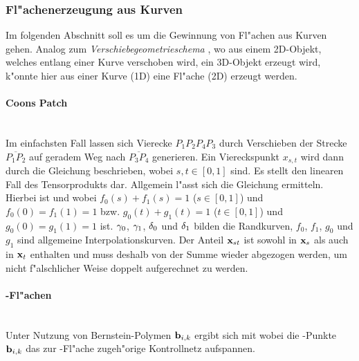 %
%

\subsubsection{Fl"achenerzeugung aus Kurven}
\label{freiform}
Im folgenden Abschnitt soll es um die Gewinnung von Fl"achen aus Kurven gehen. 
Analog zum \emph{Verschiebegeometrieschema} , wo aus 
einem 2D-Objekt, welches entlang einer Kurve verschoben wird, ein 3D-Objekt 
erzeugt wird, k"onnte hier aus einer Kurve (1D) eine Fl"ache (2D) erzeugt 
werden. 

\paragraph{Coons Patch}~\\
Im einfachsten Fall lassen sich 
Vierecke $P_1P_2P_4P_3$ durch Verschieben 
der Strecke $\overline{P_1P_2}$ auf geradem Weg nach $\overline{P_3P_4}$ 
generieren. Ein Viereckspunkt $x_{s,t}$ wird dann durch die Gleichung
beschrieben, wobei $s, t \in [0, 1]$ sind. Es stellt den linearen Fall
des Tensorprodukts dar. Allgemein l"asst sich die Gleichung
ermitteln. Hierbei ist
und
wobei $f_0(s) + f_1(s) = 1$ ($s \in{} [0, 1]$) und 
$f_0(0) = f_1(1) = 1$ bzw. $g_0(t) + g_1(t) = 1$ ($t \in{} [0, 1]$) 
und $g_0(0) = g_1(1) = 1$ ist. ${\bf \gamma}_0$, ${\bf \gamma}_1$, 
${\bf \delta}_0$ und ${\bf \delta}_1$ bilden die Randkurven, 
$f_0$, $f_1$, $g_0$ und $g_1$ sind allgemeine Interpolationskurven.
Der Anteil ${\bf x}_{st}$ ist sowohl in ${\bf x}_s$ als auch in 
${\bf x}_t$ enthalten und muss deshalb von der Summe wieder abgezogen 
werden, um nicht f"alschlicher Weise doppelt aufgerechnet zu werden.

\paragraph{\bez-Fl"achen}~\\
Unter Nutzung von Bernstein-Polymen ${\bf b}_{i,k}$ ergibt sich mit 
wobei die \bez-Punkte ${\bf b}_{i,k}$ das zur \bez-Fl"ache zugeh"orige 
Kontrollnetz aufspannen.

